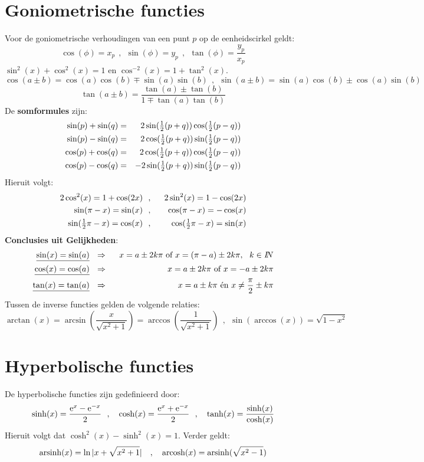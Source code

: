 \documentclass[twoside]{report}
\begin{document}
\section{Goniometrische functies}
Voor de goniometrische verhoudingen van een punt $p$ op de eenheidscirkel geldt:
\[
\cos(\phi)=x_p~~,~~\sin(\phi)=y_p~~,~~\tan(\phi)=\frac{y_p}{x_p}
\]
$\sin^2(x)+\cos^2(x)=1$ en $\cos^{-2}(x)=1+\tan^2(x)$.
\[
\cos(a\pm b)=\cos(a)\cos(b)\mp\sin(a)\sin(b)~~,~~
\sin(a\pm b)=\sin(a)\cos(b)\pm\cos(a)\sin(b)
\]
\[
\tan(a\pm b)=\frac{\tan(a)\pm\tan(b)}{1\mp\tan(a)\tan(b)}
\]
De {\bf somformules} zijn:
\begin{eqnarray*}
\sin(p)+\sin(q)&=&2\sin(\mbox{$\frac{1}{2}$}(p+q))\cos(\mbox{$\frac{1}{2}$}(p-q))\\
\sin(p)-\sin(q)&=&2\cos(\mbox{$\frac{1}{2}$}(p+q))\sin(\mbox{$\frac{1}{2}$}(p-q))\\
\cos(p)+\cos(q)&=&2\cos(\mbox{$\frac{1}{2}$}(p+q))\cos(\mbox{$\frac{1}{2}$}(p-q))\\
\cos(p)-\cos(q)&=&-2\sin(\mbox{$\frac{1}{2}$}(p+q))\sin(\mbox{$\frac{1}{2}$}(p-q))\\
\end{eqnarray*}
Hieruit volgt:
\begin{eqnarray*}
2\cos^2(x)=1+\cos(2x)   &~~,~~&2\sin^2(x)=1-\cos(2x)\\
\sin(\pi-x)=\sin(x)     &~~,~~&\cos(\pi-x)=-\cos(x)\\
\sin(\mbox{$\frac{1}{2}$}\pi-x)=\cos(x)&~~,~~&\cos(\mbox{$\frac{1}{2}$}\pi-x)=\sin(x)
\end{eqnarray*}
{\bf Conclusies uit Gelijkheden}:
\begin{eqnarray*}
\underline{\sin(x)=\sin(a)}&~~\Rightarrow~~&x=a\pm2k\pi\mbox{ of }x=(\pi-a)\pm2k\pi,~~k\in I\hspace{-1mm}N\\
\underline{\cos(x)=\cos(a)}&~~\Rightarrow~~&x=a\pm2k\pi\mbox{ of }x=-a\pm2k\pi\\
\underline{\tan(x)=\tan(a)}&~~\Rightarrow~~&x=a\pm k\pi\mbox{ \'en }x\neq\frac{\pi}{2}\pm k\pi
\end{eqnarray*}
Tussen de inverse functies gelden de volgende relaties:
\[
\arctan(x)=\arcsin\left(\frac{x}{\sqrt{x^2+1}}\right)=\arccos\left(\frac{1}{\sqrt{x^2+1}}\right)~~,~~
\sin(\arccos(x))=\sqrt{1-x^2}
\]

\section{Hyperbolische functies}
De hyperbolische functies zijn gedefinieerd door:
\[
\sinh(x)=\frac{{\rm e}^x-{\rm e}^{-x}}{2}~~,~~~\cosh(x)=\frac{{\rm e}^x+{\rm e}^{-x}}{2}~~,~~~\tanh(x)=\frac{\sinh(x)}{\cosh(x)}
\]
Hieruit volgt dat $\cosh^2(x)-\sinh^2(x)=1$. Verder geldt:
\[
{\rm arsinh}(x)=\ln|x+\sqrt{x^2+1}|~~~,~~~{\rm arcosh}(x)={\rm arsinh}(\sqrt{x^2-1})
\]
\end{document}
